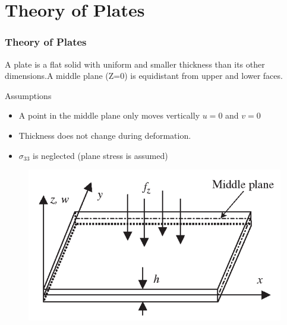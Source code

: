 \documentclass[9pt]{beamer}
\begin{document}
\section{Theory of Plates}
\begin{frame}
\frametitle{Theory of Plates}
A plate is a flat solid with uniform and smaller thickness than its other dimensions.A middle plane (Z=0) is equidistant from upper and lower faces.
\begin{block}{Assumptions}
\begin{itemize}
\item A point in the middle plane only moves vertically $u = 0$ and $v = 0 $
\item Thickness does not change during deformation.
\item $\sigma_{33}$ is neglected (plane stress is assumed)
\end{itemize}
\end{block}

\begin{figure}[h!]
  \includegraphics[width=0.5\linewidth,trim={0 0 0 1cm},clip]{plate.png}
\end{figure}

\end{frame}
\end{document}
